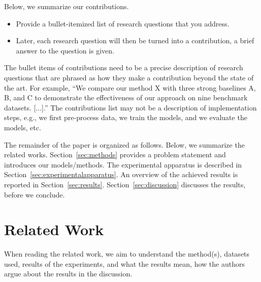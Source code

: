 \documentclass[sigconf, nonacm]{acmart}
\begin{document}
Below, we summarize our contributions.
\begin{itemize}
    \item Provide a bullet-itemized list of research questions that you address. 
    \item Later, each research question will then be turned into a contribution, \ie a brief answer to the question is given. 
\end{itemize}

\begin{tcolorbox}[title=Introduction What is a contribution item and what not.]
The bullet items of contributions need to be a precise description of research questions that are phrased as how they make a contribution beyond the state of the art. 
For example, ``We compare our method X with three strong baselines A, B, and C to demonstrate the effectiveness of our approach on nine benchmark datasets. [...].'' 
The contributions list may not be a description of implementation steps, e.g., we first pre-process data, we train the models, and we evaluate the models, etc. 


\end{tcolorbox}


The remainder of the paper is organized as follows.
%
Below, we summarize the related works.
Section~\ref{sec:methods} provides a problem statement and introduces our models/methods.
The experimental apparatus is described in Section~\ref{sec:experimentalapparatus}.
An overview of the achieved results is reported in Section~\ref{sec:results}. 
Section~\ref{sec:discussion} discusses the results, before we conclude.



\section{Related Work}
\label{sec:relatedwork}

When reading the related work, we aim to understand the method(s), datasets used, results of the experiments, and what the results mean, \ie how the authors argue about the results in the discussion.
\end{document}
